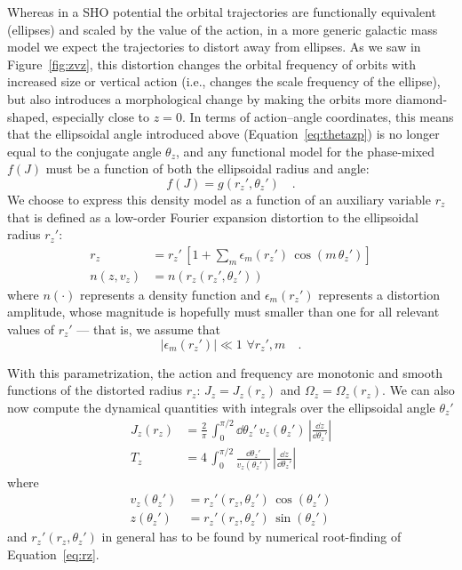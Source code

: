 Whereas in a SHO potential the orbital trajectories are functionally equivalent
(ellipses) and scaled by the value of the action, in a more generic galactic mass model
we expect the trajectories to distort away from ellipses.
As we saw in Figure~\ref{fig:zvz}, this distortion changes the orbital frequency of
orbits with increased size or vertical action (i.e., changes the scale frequency of the
ellipse), but also introduces a morphological change by making the orbits more
diamond-shaped, especially close to $z=0$.
In terms of action--angle coordinates, this means that the ellipsoidal angle introduced
above (Equation~\ref{eq:thetazp}) is no longer equal to the conjugate angle $\theta_z$,
and any functional model for the phase-mixed \df\ $f(J)$ must be a function of both the
ellipsoidal radius and angle:
\begin{equation}
    f(J) = g(r_z', \theta_z') \quad .
\end{equation}
We choose to express this density model as a function of an auxiliary variable $r_z$
that is defined as a low-order Fourier expansion distortion to the ellipsoidal radius
$r_z'$:
\begin{align}
    r_z &= r_z' \, \left[1 + \sum_m \epsilon_m(r_z') \, \cos{\left(m\,\theta_z'\right)}\right] \label{eq:rz} \\
    n(z, v_z) &= n(r_z(r_z', \theta_z'))
\end{align}
where $n(\cdot)$ represents a density function and $\epsilon_m(r_z')$ represents a
distortion amplitude, whose magnitude is hopefully must smaller than one for all
relevant values of $r_z'$ --- that is, we assume that
\begin{equation}
    |\epsilon_m(r_z')| \ll 1 \,\, \forall r_z', m \quad .
\end{equation}

With this parametrization, the action and frequency are monotonic and smooth functions
of the distorted radius $r_z$: $J_z = J_z(r_z)$ and $\Omega_z = \Omega_z(r_z)$.
We can also now compute the dynamical quantities with integrals over the ellipsoidal
angle $\theta_z'$
\begin{align}
    J_z(r_z) &= \frac{2}{\pi} \, \int_0^{\pi/2} \dd \theta_z' \, v_z(\theta_z')
        \, \left|\frac{\dd z}{\dd \theta_z'}\right| \\
    T_z &= 4 \, \int_0^{\pi/2} \frac{\dd \theta_z'}{v_z(\theta_z')}
        \, \left|\frac{\dd z}{\dd \theta_z'}\right|
\end{align}
where
\begin{align}
    v_z(\theta_z') &= r_z'(r_z, \theta_z') \, \cos{(\theta_z')} \\
    z(\theta_z') &= r_z'(r_z, \theta_z') \, \sin{(\theta_z')}
\end{align}
and $r_z'(r_z, \theta_z')$ in general has to be found by numerical root-finding of
Equation~\ref{eq:rz}.


